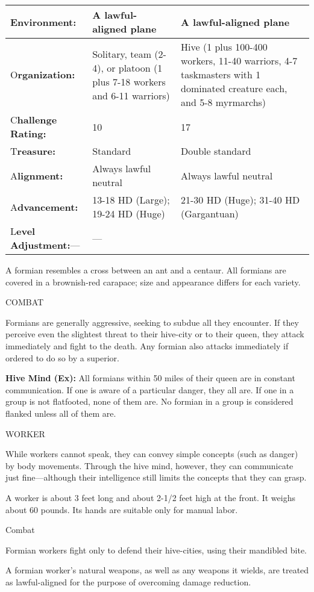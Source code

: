 \documentclass{article}
\begin{document}
\begin{tabular}{|>{\raggedright}p{49pt}|>{\raggedright}p{132pt}|>{\raggedright}p{132pt}|}
\hline
E\textbf{nvironment: } & A lawful-aligned plane & A lawful-aligned plane\tabularnewline
\hline
O\textbf{rganization:} & Solitary, team (2-4), or platoon (1 plus 7-18 workers 
and 6-11 warriors) & Hive (1 plus 100-400 workers, 11-40 warriors, 4-7 taskmasters 
with 1 dominated creature each, and 5-8 myrmarchs)\tabularnewline
\hline
C{\small{}\textbf{hallenge Rating:}} & 1{\small{}0} & 1{\small{}7}\tabularnewline
\hline
T\textbf{reasure:} & Standard & Double standard\tabularnewline
\hline
A\textbf{lignment:} & Always lawful neutral & Always lawful neutral\tabularnewline
\hline
A\textbf{dvancement:} & 13-18 HD (Large); 19-24 HD (Huge) & 21-30 HD (Huge); 31-40 
HD (Gargantuan)\tabularnewline
\hline
L\textbf{evel Adjustment:}--- & --- & \tabularnewline
\hline
\end{tabular}

\vspace{12pt}
A formian resembles a cross between an ant and a centaur. All formians are covered 
in a brownish-red carapace; size and appearance differs for each variety.

COMBAT

Formians are generally aggressive, seeking to subdue all they encounter. If they 
perceive even the slightest threat to their hive-city or to their queen, they attack 
immediately and fight to the death. Any formian also attacks immediately if ordered 
to do so by a superior.

\textbf{Hive Mind (Ex):} All formians within 50 miles of their queen are in constant 
communication. If one is aware of a particular danger, they all are. If one in 
a group is not flatfooted, none of them are. No formian in a group is considered 
flanked unless all of them are.

WORKER

While workers cannot speak, they can convey simple concepts (such as danger) by 
body movements. Through the hive mind, however, they can communicate just fine---although 
their intelligence still limits the concepts that they can grasp.

A worker is about 3 feet long and about 2-1/2 feet high at the front. It weighs 
about 60 pounds. Its hands are suitable only for manual labor.

Combat

Formian workers fight only to defend their hive-cities, using their mandibled bite.

A formian worker's natural weapons, as well as any weapons it wields, are treated 
as lawful-aligned for the purpose of overcoming damage reduction.
\end{document}
